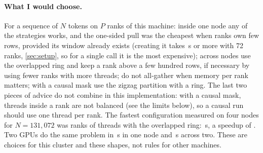 \paragraph{What I would choose.} For a sequence of $N$ tokens on $P$ ranks of this
machine: inside one node any of the strategies works, and the one-sided pull was
the cheapest when ranks own few rows, provided its window already exists
(creating it takes \,s or more with 72 ranks,
\cref{sec:setup}, so for a single call it is the most expensive); across nodes
use the overlapped ring and
keep a rank above a few hundred rows, if necessary by using fewer ranks with more
threads; do not all-gather when memory per rank matters; with a causal mask use
the zigzag partition with a ring. The last two pieces of advice do not combine in
this implementation: with a causal mask, threads inside a rank are not balanced
(see the limits below), so a causal run should use one thread per rank. The
fastest configuration measured on four
nodes for $N=131{,}072$ was  ranks of
 threads with the overlapped ring:
\,s, a speedup of . Two GPUs do the
same problem in \,s in one node and
\,s across two. These are choices for this
cluster and these shapes, not rules for other machines.


